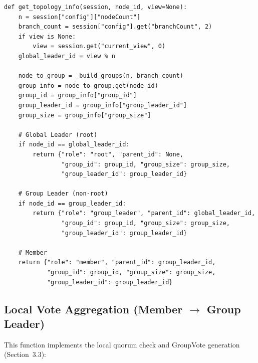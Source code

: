 \documentclass[12pt,a4paper]{article}
\begin{document}
\begin{lstlisting}[caption={Role assignment (\texttt{topology\_manager.py})}, label=lst:topo]
def get_topology_info(session, node_id, view=None):
    n = session["config"]["nodeCount"]
    branch_count = session["config"].get("branchCount", 2)
    if view is None:
        view = session.get("current_view", 0)
    global_leader_id = view % n

    node_to_group = _build_groups(n, branch_count)
    group_info = node_to_group.get(node_id)
    group_id = group_info["group_id"]
    group_leader_id = group_info["group_leader_id"]
    group_size = group_info["group_size"]

    # Global Leader (root)
    if node_id == global_leader_id:
        return {"role": "root", "parent_id": None,
                "group_id": group_id, "group_size": group_size,
                "group_leader_id": group_leader_id}

    # Group Leader (non-root)
    if node_id == group_leader_id:
        return {"role": "group_leader", "parent_id": global_leader_id,
                "group_id": group_id, "group_size": group_size,
                "group_leader_id": group_leader_id}

    # Member
    return {"role": "member", "parent_id": group_leader_id,
            "group_id": group_id, "group_size": group_size,
            "group_leader_id": group_leader_id}
\end{lstlisting}

\subsection{Local Vote Aggregation (Member $\to$ Group Leader)}

This function implements the local quorum check and GroupVote generation (Section~3.3):
\end{document}
